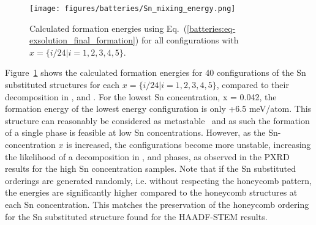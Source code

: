 \begin{refsection}
\begin{figure}[ht] 
\centering 
\captionsetup{width=0.9\linewidth}
\texttt{[image: figures/batteries/Sn\_mixing\_energy.png]} 
\caption{Calculated formation energies using 
Eq.~(\ref{batteries:eq-exsolution_final_formation}) for all configurations 
with $x = \{i/24|i=1,2,3,4,5\}$.} 
\label{batteries:fig-Sn_mixing} 
\end{figure} 
 
Figure~\ref{batteries:fig-Sn_mixing} shows the calculated formation energies 
for 40 configurations of the Sn substituted structures for each $x = 
\{i/24|i=1,2,3,4,5\}$, compared to their decomposition in 
,  and . For the lowest Sn 
concentration, x = 0.042, the formation energy of the lowest energy 
configuration is only +6.5 meV/atom. This structure can 
reasonably be considered as metastable~\cite{Sun2016} and as such the 
formation of a single phase is feasible at low Sn concentrations. However, as 
the Sn-concentration $x$ is increased, the  
configurations become more unstable, increasing the likelihood of a 
decomposition in ,  and  phases, as 
observed in the \gls{PXRD} results for the high Sn concentration samples. Note that 
if the Sn substituted orderings are generated randomly, i.e. without 
respecting the honeycomb pattern, the energies are significantly higher 
compared to the honeycomb structures at each Sn concentration. This matches 
the preservation of the honeycomb ordering for the Sn substituted structure 
found for the \gls{HAADF}-STEM results. 
 


\end{refsection}
